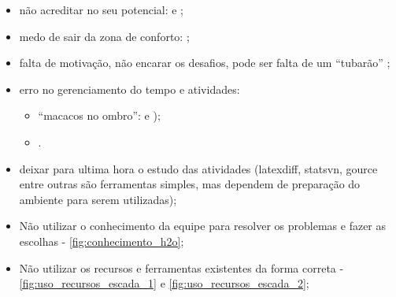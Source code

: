 \begin{itemize}
    \item não acreditar no seu potencial: 
    e
    ;
    
    \item medo de sair da zona de conforto:
    ;
    
    \item falta de motivação, não encarar os desafios, pode ser falta de um \enquote{tubarão} \cite{tubarao_na_vida} \cite{put_a_shark_in_your_tank} \cite{employees_challenge};
    
    \item erro no gerenciamento do tempo e atividades:
    \begin{itemize}
        \item \enquote{macacos no ombro}:
    e
    );
    
        \item {} \cite{ted_tim_urban_procastinator}.
    \end{itemize}

    \item deixar para ultima hora o estudo das atividades (latexdiff, statsvn, gource entre outras são ferramentas simples, mas dependem de preparação do ambiente para serem utilizadas);

    \item Não utilizar o conhecimento da equipe para resolver os problemas e fazer as escolhas - \autoref{fig:conhecimento_h2o};
    
    \item Não utilizar os recursos e ferramentas existentes da forma correta - \autoref{fig:uso_recursos_escada_1} e \autoref{fig:uso_recursos_escada_2};


\end{itemize}
